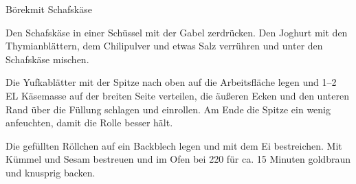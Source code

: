 \begin{recipe}{Börek}{mit Schafskäse}
  \label{Börek}
  \inglist

  \steps

  Den Schafskäse in einer Schüssel mit der Gabel zerdrücken. Den Joghurt mit
  den Thymianblättern, dem Chilipulver und etwas Salz verrühren und unter den
  Schafskäse mischen.

  Die Yufkablätter mit der Spitze nach oben auf die Arbeitsfläche legen und 1--2
  EL Käsemasse auf der breiten Seite verteilen, die äußeren Ecken und den
  unteren Rand über die Füllung schlagen und einrollen. Am Ende die Spitze ein
  wenig anfeuchten, damit die Rolle besser hält.

  Die gefüllten Röllchen auf ein Backblech legen und mit dem Ei bestreichen. Mit
  Kümmel und Sesam bestreuen und im Ofen bei 220 \gradc für ca. 15 Minuten
  goldbraun und knusprig backen.

 \end{recipe}

